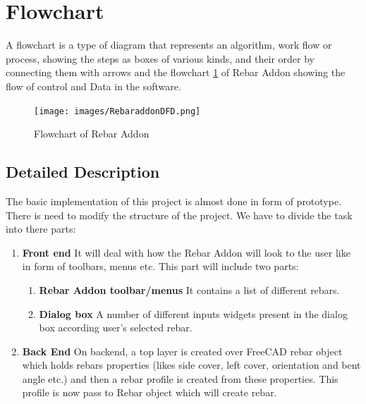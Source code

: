 \section{Flowchart}
A flowchart is a type of diagram that represents an algorithm, work flow or process, showing the steps as boxes of various kinds, and their order by connecting them with arrows
and the flowchart \ref{fig:FD1} of Rebar Addon showing the flow of control and Data in the software.

\begin{figure}
	\centering \texttt{[image: images/RebaraddonDFD.png]}
	\caption{Flowchart of Rebar Addon}
	\label{fig:FD1}
\end{figure}

\subsection{Detailed Description}

The basic implementation of this project is almost done in form of prototype. There is need to modify the structure of the project. We have to divide the task into there parts:

\begin{enumerate}
	\item \textbf{Front end}
	It will deal with how the Rebar Addon will look to the user like in form of toolbars, menus etc. This part will include two parts:
	\begin{enumerate}
		\item \textbf{Rebar Addon toolbar/menus}
		It contains a list of different rebars.
		\item \textbf{Dialog box}
		A number of different inputs widgets present in the dialog box according user's selected rebar.
	\end{enumerate}
	
	\item \textbf{Back End}
	On backend, a top layer is created over FreeCAD rebar object which holds rebars properties (likes side cover, left cover, orientation and bent angle etc.) and then a rebar profile is created from these properties. This profile is now pass to Rebar object which will create rebar.  
	
\end{enumerate}


